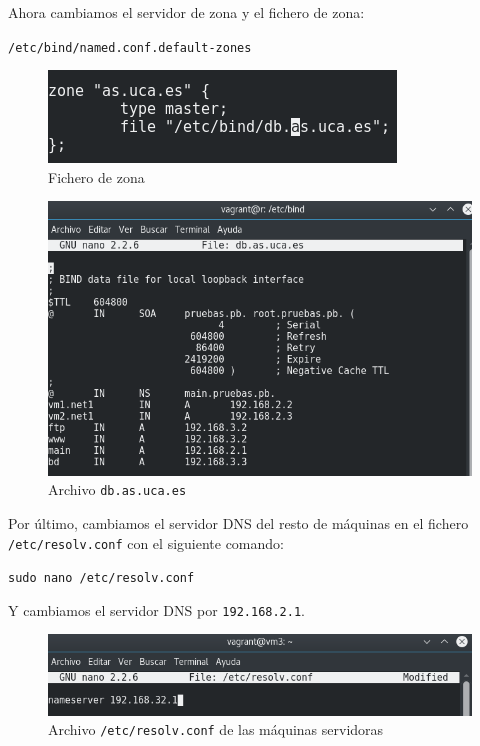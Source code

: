 \documentclass[12pt,letterpaper]{article}
\begin{document}
Ahora cambiamos el servidor de zona y el fichero de zona:
\begin{center}
	\texttt{/etc/bind/named.conf.default-zones}
\end{center}
\begin{figure}[h]
	\centering
	\includegraphics[scale=0.75]{Zona.png}
	\caption{Fichero de zona}
\end{figure}
\begin{figure}[h]
	\centering
	\includegraphics[scale=0.65]{BD.png}
	\caption{Archivo \texttt{db.as.uca.es}}
\end{figure}

Por último, cambiamos el servidor DNS del resto de máquinas en el fichero \texttt{/etc/resolv.conf} con el siguiente comando:
\begin{center}
	\texttt{sudo nano /etc/resolv.conf}
\end{center}

Y cambiamos el servidor DNS por \texttt{192.168.2.1}.
\newpage
\begin{figure}[h]
	\centering
	\includegraphics[scale=0.5]{Nameserver.png}
	\caption{Archivo \texttt{/etc/resolv.conf} de las máquinas servidoras}
\end{figure}
\end{document}
